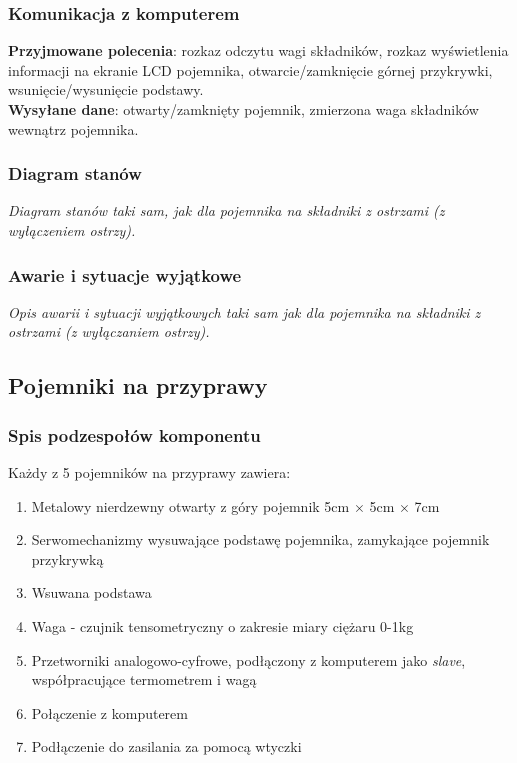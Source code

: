 \documentclass[12pt,a4paper,notitlepage]{article}
\begin{document}
\subsubsection{Komunikacja z komputerem}
\textbf{Przyjmowane polecenia}: rozkaz odczytu wagi składników, rozkaz wyświetlenia informacji na ekranie LCD pojemnika, otwarcie/zamknięcie górnej przykrywki, wsunięcie/wysunięcie podstawy.\\
\textbf{Wysyłane dane}: otwarty/zamknięty pojemnik, zmierzona waga składników wewnątrz pojemnika.

\subsubsection{Diagram stanów}
\emph{Diagram stanów taki sam, jak dla pojemnika na składniki z ostrzami (z wyłączeniem ostrzy).}

\subsubsection{Awarie i sytuacje wyjątkowe}
\emph{Opis awarii i sytuacji wyjątkowych taki sam jak dla pojemnika na składniki z ostrzami (z wyłączaniem ostrzy).}



\subsection{Pojemniki na przyprawy}
\subsubsection{Spis podzespołów komponentu}
Każdy z 5 pojemników na przyprawy zawiera:
\begin{enumerate}
  \item Metalowy nierdzewny otwarty z góry pojemnik 5cm $\times$ 5cm $\times$ 7cm
  \item Serwomechanizmy wysuwające podstawę pojemnika, zamykające pojemnik przykrywką
  \item Wsuwana podstawa
  \item Waga - czujnik tensometryczny o zakresie miary ciężaru 0-1kg
  \item Przetworniki analogowo-cyfrowe, podłączony z komputerem jako \emph{slave}, współpracujące termometrem i wagą
  \item Połączenie z komputerem
  \item Podłączenie do zasilania za pomocą wtyczki
\end{enumerate}
 
\end{document}
